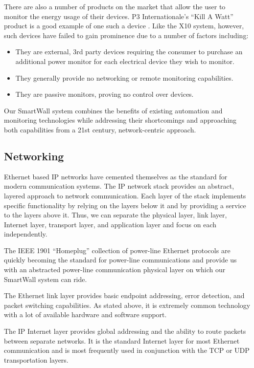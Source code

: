 \documentclass[11pt]{article}
\begin{document}
There are also a number of products on the market that allow the user
to monitor the energy usage of their devices. P3 Internationale's
``Kill A Watt'' product is a good example of one such a device
\cite{p3-KillAWatt}. Like the X10 system, however, such devices have
failed to gain prominence due to a number of factors including:
\begin{itemize}
  \setlength{\itemsep}{0pt}
  \setlength{\parskip}{0pt}
  \setlength{\parsep}{0pt}
\item They are external, 3rd party devices requiring the consumer to
  purchase an additional power monitor for each electrical device they
  wish to monitor. 
\item They generally provide no networking or remote monitoring capabilities.
\item They are passive monitors, proving no control over devices.
\end{itemize}  

Our SmartWall system combines the benefits of existing automation and
monitoring technologies while addressing their shortcomings and
approaching both capabilities from a 21st century, network-centric approach.

\subsection{Networking}
Ethernet based IP networks have cemented themselves as the standard
for modern communication systems. The IP network stack provides an
abstract, layered approach to network communication. Each layer of the
stack implements specific functionality by relying on the layers below
it and by providing a service to the layers above it. Thus, we can
separate the physical layer, link layer, Internet layer, transport
layer, and application layer and focus on each independently.

The IEEE 1901 ``Homeplug'' collection of power-line Ethernet protocols are
quickly becoming the standard for power-line communications and provide
us with an abstracted power-line communication physical layer on which our
SmartWall system can ride.

The Ethernet link layer provides basic endpoint addressing, error
detection, and packet switching capabilities. As stated above, it is
extremely common technology with a lot of available hardware and
software support.

The IP Internet layer provides global addressing and the ability to
route packets between separate networks. It is the standard Internet layer
for most Ethernet communication and is most frequently used in
conjunction with the TCP or UDP transportation layers.
\end{document}
